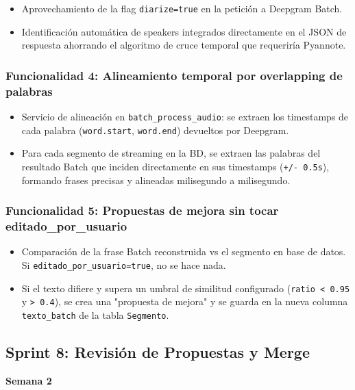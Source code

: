 \documentclass[12pt,a4paper]{report}
\begin{document}
\begin{itemize}
    \item Aprovechamiento de la flag \texttt{diarize=true} en la petición a Deepgram Batch.
    \item Identificación automática de speakers integrados directamente en el JSON de respuesta ahorrando el algoritmo de cruce temporal que requeriría Pyannote.
\end{itemize}

\subsubsection{Funcionalidad 4: Alineamiento temporal por overlapping de palabras}

\begin{itemize}
    \item Servicio de alineación en \texttt{batch\_process\_audio}: se extraen los timestamps de cada palabra (\texttt{word.start}, \texttt{word.end}) devueltos por Deepgram.
    \item Para cada segmento de streaming en la BD, se extraen las palabras del resultado Batch que inciden directamente en sus timestamps (\texttt{+/- 0.5s}), formando frases precisas y alineadas milisegundo a milisegundo.
\end{itemize}

\subsubsection{Funcionalidad 5: Propuestas de mejora sin tocar editado\_por\_usuario}

\begin{itemize}
    \item Comparación de la frase Batch reconstruida vs el segmento en base de datos. Si \texttt{editado\_por\_usuario=true}, no se hace nada.
    \item Si el texto difiere y supera un umbral de similitud configurado (\texttt{ratio < 0.95} y \texttt{> 0.4}), se crea una "propuesta de mejora" y se guarda en la nueva columna \texttt{texto\_batch} de la tabla \texttt{Segmento}.
\end{itemize}

\subsection{Sprint 8: Revisión de Propuestas y Merge}

\textbf{Semana 2}
\end{document}
